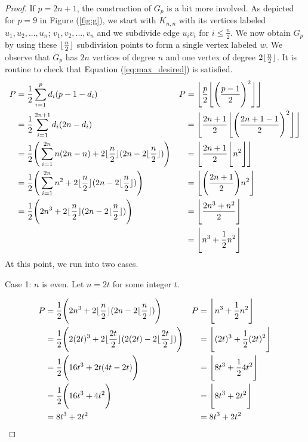 \documentclass[10pt]{amsart}
\DeclarePairedDelimiter{\floor}{\lfloor}{\rfloor}
\begin{document}
\begin{proof}
    If $p=2n+1$, the construction of $G_p$ is a bit more involved. As depicted for $p=9$ in Figure 
    (\ref{fig:g}), we start with $K_{n,n}$ with its vertices labeled $u_1, u_2,...,u_n$; $v_1, v_2,...,v_n$ 
    and we subdivide edge $u_iv_i$ for $i \leq \frac{n}{2}$. We now obtain $G_p$ by using these 
    $\floor{\frac{n}{2}}$ subdivision points to form a single vertex labeled $w$. We observe that 
    $G_p$ has $2n$ vertices of degree $n$ and one vertex of degree $2\floor{\frac{n}{2}}$. It is 
    routine to check that Equation (\ref{eq:max_desired}) is satisfied.
    \begin{align*}
        P &= \frac{1}{2} \sum^{p}_{i=1}{d_i(p - 1 - d_i)}                                                      & P &= \bfloor{\frac{p}{2} \bfloor{ \bparen{ \frac{p - 1}{2} }^2 }} \notag \\
          &= \frac{1}{2} \sum^{2n+1}_{i=1}{d_i(2n - d_i)}                                                      &   &= \bfloor{\frac{2n+1}{2} \bfloor{ \bparen{ \frac{2n + 1 - 1}{2} }^2 }} \notag \\
          &= \frac{1}{2} \bparen{\sum^{2n}_{i=1}{n(2n - n)} + 2\floor{\frac{n}{2}}(2n - 2\floor{\frac{n}{2}})} &   &= \bfloor{\frac{2n+1}{2} \bfloor{ n^2 }} \notag \\
          &= \frac{1}{2} \bparen{\sum^{2n}_{i=1}{n^2} + 2\floor{\frac{n}{2}}(2n - 2\floor{\frac{n}{2}})}       &   &= \bfloor{\bparen{\frac{2n+1}{2}} n^2} \notag \\
          &= \frac{1}{2} \bparen{2n^3 + 2\floor{\frac{n}{2}}(2n - 2\floor{\frac{n}{2}})}                       &   &= \bfloor{\frac{2n^3+n^2}{2}}  \notag \\
          &                                                                                                    &   &= \bfloor{ n^3 + \frac{1}{2}n^2 } \notag
    \end{align*}
    At this point, we run into two cases.

    \pagebreak

    \noindent Case 1: $n$ is even. Let $n = 2t$ for some integer $t$.

    \begin{align*}
        P &= \frac{1}{2} \bparen{2n^3 + 2\floor{\frac{n}{2}}(2n - 2\floor{\frac{n}{2}})}         & P &= \bfloor{ n^3 + \frac{1}{2}n^2 } \notag \\
          &= \frac{1}{2} \bparen{2(2t)^3 + 2\floor{\frac{2t}{2}}(2(2t) - 2\floor{\frac{2t}{2}})} &   &= \bfloor{ (2t)^3 + \frac{1}{2}(2t)^2 } \notag \\
          &= \frac{1}{2} \bparen{16t^3 + 2t(4t - 2t)}                                            &   &= \bfloor{ 8t^3 + \frac{1}{2}4t^2 } \notag \\
          &= \frac{1}{2} \bparen{16t^3 + 4t^2}                                                   &   &= \bfloor{ 8t^3 + 2t^2 } \notag \\
          &= 8t^3 + 2t^2                                                                         &   &= 8t^3 + 2t^2 \notag
    \end{align*}


\end{proof}
\end{document}
